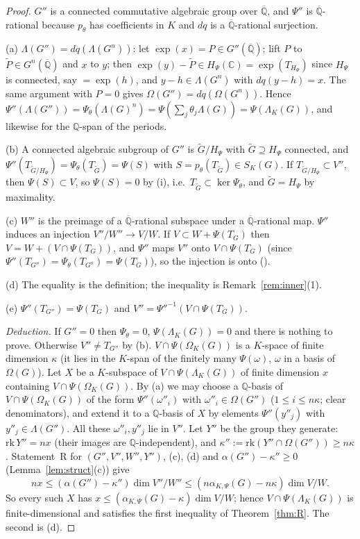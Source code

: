 \documentclass[11pt]{amsart}
\theoremstyle{definition}
\newcommand{\Qb}{\overline{\mathbb{Q}}}
\newcommand{\C}{\mathbb{C}}
\newcommand{\Q}{\mathbb{Q}}
\begin{document}
\begin{proof}
$G''$ is a connected commutative algebraic group over $\Qb$, and $\Psi''$ is $\Qb$-rational because $p_\theta$ has
coefficients in $K$ and $dq$ is a $\Qb$-rational surjection.

(a) $\Lambda(G'')=dq(\Lambda(G^n))$: let $\exp(x)=P\in G''(\Qb)$; lift $P$ to $\tilde P\in G^n(\Qb)$ and $x$ to $y$; then
$\exp(y)-\tilde P\in H_\Psi(\C)=\exp(T_{H_\Psi})$ since $H_\Psi$ is connected, say $=\exp(h)$, and $y-h\in\Lambda(G^n)$ with
$dq(y-h)=x$. The same argument with $P=0$ gives $\Omega(G'')=dq(\Omega(G^n))$. Hence
$\Psi''(\Lambda(G''))=\Psi_\theta(\Lambda(G)^n)=\Psi(\sum_j\theta_j\Lambda(G))=\Psi(\Lambda_K(G))$, and likewise for the
$\Q$-span of the periods.

(b) A connected algebraic subgroup of $G''$ is $\tilde G/H_\Psi$ with $\tilde G\supseteq H_\Psi$ connected, and
$\Psi''(T_{\tilde G/H_\Psi})=\Psi_\theta(T_{\tilde G})=\Psi(S)$ with $S=p_\theta(T_{\tilde G})\in S_K(G)$. If
$T_{\tilde G/H_\Psi}\subset V''$, then $\Psi(S)\subset V$, so $\Psi(S)=0$ by (i), i.e.\ $T_{\tilde G}\subset\ker\Psi_\theta$,
and $\tilde G=H_\Psi$ by maximality.

(c) $W''$ is the preimage of a $\Qb$-rational subspace under a $\Qb$-rational map. $\Psi''$ induces an injection
$V''/W''\to V/W$. If $V\subset W+\Psi(T_G)$ then $V=W+(V\cap\Psi(T_G))$, and $\Psi''$ maps $V''$ onto
$V\cap\Psi(T_G)$ (since $\Psi''(T_{G''})=\Psi_\theta(T_{G^n})=\Psi(T_G)$), so the injection is onto
(\cite[(3)]{RW93}).

(d) The equality is the definition; the inequality is Remark~\ref{rem:inner}(1).

(e) $\Psi''(T_{G''})=\Psi(T_G)$ and $V''=\Psi''^{-1}(V\cap\Psi(T_G))$.

\emph{Deduction.} If $G''=0$ then $\Psi_\theta=0$, $\Psi(\Lambda_K(G))=0$ and there is nothing to prove. Otherwise
$V''\ne T_{G''}$ by (b). $V\cap\Psi(\Omega_K(G))$ is a $K$-space of finite dimension $\kappa$ (it lies in the $K$-span of the
finitely many $\Psi(\omega)$, $\omega$ in a basis of $\Omega(G)$). Let $X$ be a $K$-subspace of $V\cap\Psi(\Lambda_K(G))$ of
finite dimension $x$ containing $V\cap\Psi(\Omega_K(G))$. By (a) we may choose a $\Q$-basis of $V\cap\Psi(\Omega_K(G))$ of the
form $\Psi''(\omega''_i)$ with $\omega''_i\in\Omega(G'')$ ($1\le i\le n\kappa$; clear denominators), and extend it to a
$\Q$-basis of $X$ by elements $\Psi''(y''_j)$ with $y''_j\in\Lambda(G'')$. All these $\omega''_i,y''_j$ lie in $V''$. Let
$Y''$ be the group they generate: $\mathrm{rk}\,Y''=nx$ (their images are $\Q$-independent), and
$\kappa'':=\mathrm{rk}(Y''\cap\Omega(G''))\ge n\kappa$. Statement~R for $(G'',V'',W'',Y'')$, (c), (d) and
$\alpha(G'')-\kappa''\ge0$ (Lemma~\ref{lem:struct}(c)) give
\[
nx\le(\alpha(G'')-\kappa'')\dim V''/W''\le(n\alpha_{K,\Psi}(G)-n\kappa)\dim V/W .
\]
So every such $X$ has $x\le(\alpha_{K,\Psi}(G)-\kappa)\dim V/W$; hence $V\cap\Psi(\Lambda_K(G))$ is finite-dimensional and
satisfies the first inequality of Theorem~\ref{thm:R}. The second is (d).
\end{proof}
\end{document}
